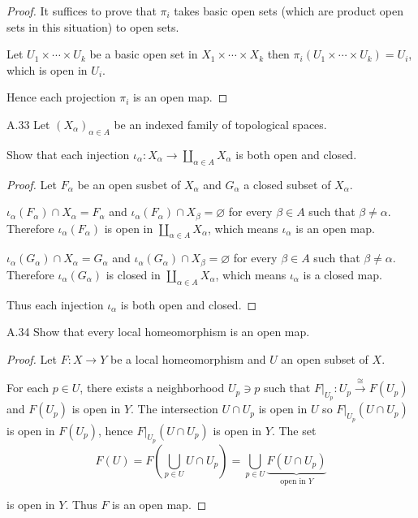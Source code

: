 \begin{proof}
    It suffices to prove that \( \pi_{i} \) takes basic open sets (which are product open sets in this situation) to open sets.

    Let \( U_{1} \times \cdots \times U_{k} \) be a basic open set in \( X_{1} \times \cdots \times X_{k} \) then \( \pi_{i}(U_{1} \times \cdots \times U_{k}) = U_{i} \), which is open in \( U_{i} \).

    Hence each projection \( \pi_{i} \) is an open map.
\end{proof}

\begin{exercise}{A.33}
    Let \({(X_{\alpha})}_{\alpha \in A}\) be an indexed family of topological spaces.

    Show that each injection \(\iota_{\alpha}\colon X_{\alpha} \rightarrow \coprod_{\alpha \in A} X_{\alpha}\) is both open and closed.
\end{exercise}

\begin{proof}
    Let \( F_{\alpha} \) be an open susbet of \( X_{\alpha} \) and \( G_{\alpha} \) a closed subset of \( X_{\alpha} \).

    \( \iota_{\alpha}(F_{\alpha}) \cap X_{\alpha} = F_{\alpha} \) and \( \iota_{\alpha}(F_{\alpha}) \cap X_{\beta} = \varnothing \) for every \( \beta \in A \) such that \( \beta \ne \alpha \). Therefore \( \iota_{\alpha}(F_{\alpha}) \) is open in \( \coprod_{\alpha \in A} X_{\alpha} \), which means \( \iota_{\alpha} \) is an open map.

    \( \iota_{\alpha}(G_{\alpha}) \cap X_{\alpha} = G_{\alpha} \) and \( \iota_{\alpha}(G_{\alpha}) \cap X_{\beta} = \varnothing \) for every \( \beta \in A \) such that \( \beta \ne \alpha \). Therefore \( \iota_{\alpha}(G_{\alpha}) \) is closed in \( \coprod_{\alpha \in A} X_{\alpha} \), which means \( \iota_{\alpha} \) is a closed map.

    Thus each injection \( \iota_{\alpha} \) is both open and closed.
\end{proof}

\begin{exercise}{A.34}
    Show that every local homeomorphism is an open map.
\end{exercise}

\begin{proof}
    Let \( F: X \to Y \) be a local homeomorphism and \( U \) an open subset of \( X \).

    For each \( p \in U \), there exists a neighborhood \( U_{p} \ni p \) such that \( F\vert_{U_{p}}: U_{p} \stackrel{\cong}{\to} F(U_{p}) \) and \( F(U_{p}) \) is open in \( Y \). The intersection \( U \cap U_{p} \) is open in \( U \) so \( F\vert_{U_{p}}(U \cap U_{p}) \) is open in \( F(U_{p}) \), hence \( F\vert_{U_{p}}(U \cap U_{p}) \) is open in \( Y \). The set
    \[
        F(U) = F\left( \bigcup_{p\in U} U \cap U_{p} \right) = \bigcup_{p\in U} \underbrace{F(U \cap U_{p})}_{\text{open in } Y}
    \]

    is open in \( Y \). Thus \( F \) is an open map.
\end{proof}

